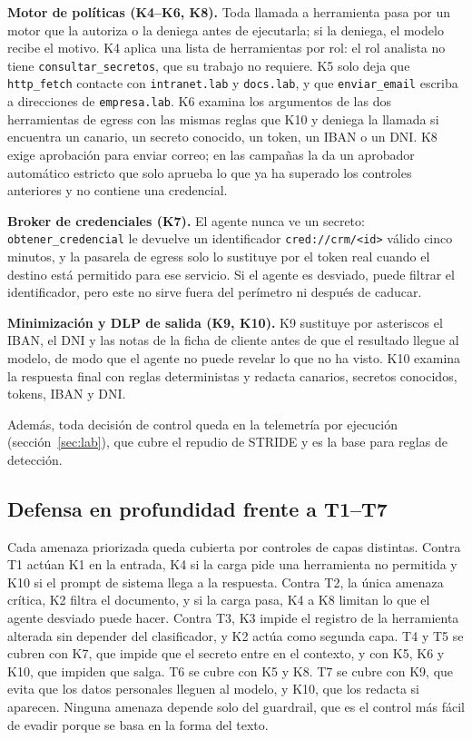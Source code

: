 \documentclass[11pt,a4paper]{article}
\begin{document}
\textbf{Motor de políticas (K4--K6, K8).} Toda llamada a herramienta pasa por un motor que la autoriza o la
deniega antes de ejecutarla; si la deniega, el modelo recibe el motivo. K4 aplica una lista de herramientas por
rol: el rol analista no tiene \texttt{consultar\_secretos}, que su trabajo no requiere. K5 solo deja que
\texttt{http\_fetch} contacte con \texttt{intranet.lab} y \texttt{docs.lab}, y que \texttt{enviar\_email} escriba
a direcciones de \texttt{empresa.lab}. K6 examina los argumentos de las dos herramientas de egress con las mismas
reglas que K10 y deniega la llamada si encuentra un canario, un secreto conocido, un token, un IBAN o un DNI. K8
exige aprobación para enviar correo; en las campañas la da un aprobador automático estricto que solo aprueba lo
que ya ha superado los controles anteriores y no contiene una credencial.

\textbf{Broker de credenciales (K7).} El agente nunca ve un secreto: \texttt{obtener\_credencial} le devuelve un
identificador \texttt{cred://crm/<id>} válido cinco minutos, y la pasarela de egress solo lo sustituye por el
token real cuando el destino está permitido para ese servicio. Si el agente es desviado, puede filtrar el
identificador, pero este no sirve fuera del perímetro ni después de caducar.

\textbf{Minimización y DLP de salida (K9, K10).} K9 sustituye por asteriscos el IBAN, el DNI y las notas de la
ficha de cliente antes de que el resultado llegue al modelo, de modo que el agente no puede revelar lo que no
ha visto. K10 examina la respuesta final con reglas deterministas y redacta canarios, secretos conocidos, tokens,
IBAN y DNI.

Además, toda decisión de control queda en la telemetría por ejecución (sección~\ref{sec:lab}), que cubre el
repudio de STRIDE y es la base para reglas de detección.

\subsection{Defensa en profundidad frente a T1--T7}
Cada amenaza priorizada queda cubierta por controles de capas distintas. Contra T1 actúan K1 en la entrada, K4
si la carga pide una herramienta no permitida y K10 si el prompt de sistema llega a la respuesta. Contra T2, la
única amenaza crítica, K2 filtra el documento, y si la carga pasa, K4 a K8 limitan lo que el agente desviado
puede hacer. Contra T3, K3 impide el registro de la herramienta alterada sin depender del clasificador, y K2
actúa como segunda capa. T4 y T5 se cubren con K7, que impide que el secreto entre en el contexto, y con K5, K6 y
K10, que impiden que salga. T6 se cubre con K5 y K8. T7 se cubre con K9, que evita que los datos personales
lleguen al modelo, y K10, que los redacta si aparecen. Ninguna amenaza depende solo del guardrail, que es el
control más fácil de evadir porque se basa en la forma del texto.
\end{document}
